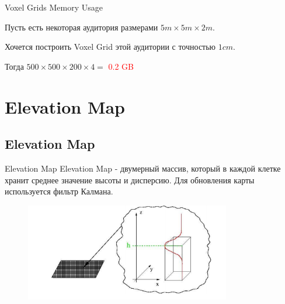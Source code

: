 \documentclass[9pt]{beamer}
\begin{document}
\begin{frame}{Voxel Grids Memory Usage}

Пусть есть некоторая аудитория размерами $5m \times 5m \times 2m$.

Хочется построить Voxel Grid этой аудитории с точностью $1cm$.

Тогда $500 \times 500 \times 200 \times 4 =$  \textcolor{red}{0.2 GB}

\end{frame}



\section{Elevation Map}

\subsection{Elevation Map}


\begin{frame}{Elevation Map}
  Elevation Map - двумерный массив, который в каждой клетке хранит среднее значение высоты и дисперсию.
  Для обновления карты используется фильтр Калмана.

  \begin{figure}[h]
    \centering
    \includegraphics[width=0.8\textwidth]{elev_m_grid.png}
  \end{figure}
\end{frame}
\end{document}
